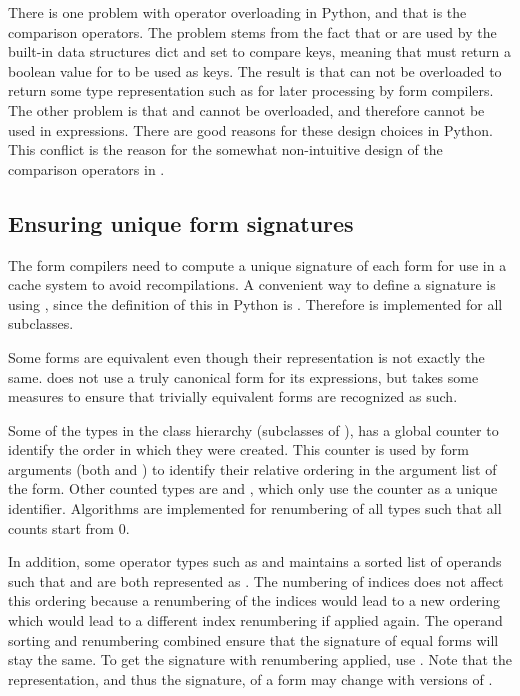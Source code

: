 There is one problem with operator overloading in Python,
and that is the comparison operators. The problem stems from
the fact that  or  are
used by the built-in data structures dict and set to compare
keys, meaning that  must return a boolean value
for  to be used as keys. The result is that
 can not be overloaded to return some
 type representation such as 
for later processing by form compilers.  The other problem is that
 and  cannot be overloaded, and therefore cannot
be used in  expressions.  There are good reasons
for these design choices in Python.  This conflict is the reason for
the somewhat non-intuitive design of the comparison operators in
\ufl{}.

\subsection{Ensuring unique form signatures} \label{ufl:sec:signatures}

The form compilers need to compute a unique signature of each form for
use in a cache system to avoid recompilations.  A convenient way to
define a signature is using , since the definition
of this in Python is .  Therefore
 is implemented for all  subclasses.

Some forms are equivalent even though their representation is not
exactly the same. \ufl{} does not use a truly canonical form for its
expressions, but takes some measures to ensure that trivially
equivalent forms are recognized as such.

Some of the types in the  class hierarchy (subclasses of
), has a global counter to identify the order in which
they were created.  This counter is used by form arguments (both
 and ) to identify their relative
ordering in the argument list of the form.  Other counted types are
 and , which only use the counter as a
unique identifier.  Algorithms are implemented for renumbering of all
 types such that all counts start from 0.

In addition, some operator types such as  and
 maintains a sorted list of operands such that
 and  are both represented as . The numbering of indices does not affect this ordering because a
renumbering of the indices would lead to a new ordering which would
lead to a different index renumbering if applied again.  The operand
sorting and renumbering combined ensure that the signature of equal
forms will stay the same.  To get the signature with renumbering
applied, use . Note that the
representation, and thus the signature, of a form may change with
versions of \ufl{}.

